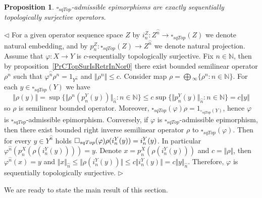 \documentclass[12pt]{article}
\newtheorem{proposition}[theorem]{Proposition}
\newenvironment{proof}{\par $\triangleleft$}{$\triangleright$}
\begin{document}
\begin{proposition}\label{PrDecsTopAdmEpiMorph} $\square_{sqTop}$-admissible 
epimorphisms are exactly sequentially topologically surjective operators.
\end{proposition}
\begin{proof}
For a given operator sequence space $Z$ 
by $i_n^Z:Z^{\wideparen{n}}\to\square_{sqTop}(Z)$ we denote natural embedding, 
and by $p_n^Z:\square_{sqTop}(Z)\to Z^{\wideparen{n}}$ we denote natural 
projection. Assume that $\varphi:X\to Y$ is $c$-sequentially topologically 
surjective. Fix $n\in\mathbb{N}$, then by 
proposition~\ref{PrCTopSurIsRetrInNor0} there exist bounded semilinear 
operator $\rho^n$ such 
that $\varphi^{\wideparen{n}}\rho^n=1_{Y^{\wideparen{n}}}$ 
and $\Vert\rho^n\Vert\leq c$. Consider 
map $ \rho=\bigoplus{}_\infty \{\rho^n:n\in\mathbb{N} \}$. For 
each $y\in \square_{sqTop}(Y)$ we have 
$$
\Vert \rho(y)\Vert=\sup \{\Vert\rho^n(p_n^Y(y))\Vert_{\wideparen{n}}:
n\in\mathbb{N} \}\leq c\sup \{\Vert p_n^Y(y)\Vert_{\wideparen{n}}:
n\in\mathbb{N} \}=c\Vert y\Vert
$$
so $\rho$ is semilinear bounded operator. 
Moreover, $\square_{sqTop}(\varphi)\rho=1_{\square_{sqTop}(Y)}$, 
hence $\varphi$ is $\square_{sqTop}$-admissible epimorphism. Conversely, if 
$\varphi$ is $\square_{sqTop}$-admissible epimorphism, then there exist 
bounded right inverse semilinear operator $\rho$ to $\square_{sqTop}(\varphi)$. 
Then for every $y\in Y^{\wideparen{n}}$ 
holds $\square_{sqTop}(\varphi)\\\rho(i_n^Y(y))=i_n^Y(y)$. 
In particular $\varphi^{\wideparen{n}}(p_n^X(\rho(i_n^Y(y))))=y$. 
Denote $x=p_n^X(\rho(i_n^Y(y)))$ and 
$c=\Vert\rho\Vert$, then $\varphi^{\wideparen{n}}(x)=y$ 
and $\Vert x\Vert_{\wideparen{n}}
\leq\Vert\rho(i_n^Y(y))\Vert
\leq c\Vert i_n^Y(y)\Vert=c\Vert y\Vert_{\wideparen{n}}$. Therefore, 
$\varphi$ is sequentially topologically surjective.
\end{proof}

We are ready to state the main result of this section.
\end{document}
